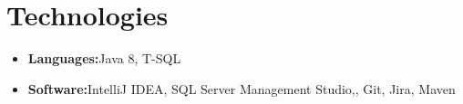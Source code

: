 \documentclass[letterpaper,11pt]{article}
\newcommand{\resumeSubHeadingListStart}{\begin{itemize}[leftmargin=*]}
\newcommand{\resumeSubHeadingListEnd}{\end{itemize}}
\begin{document}
	
	
	\section{Technologies}
	\resumeSubHeadingListStart
	\item{
		\textbf{Languages:}{\hfill Java 8, T-SQL}	
		\vspace{-5pt}	
	}
	\item{
		\textbf{Software:}{\hfill IntelliJ IDEA, SQL Server Management Studio,, Git, Jira, Maven}
		\vspace{-5pt}		
	}
	
%
	
	\resumeSubHeadingListEnd
	
	
\end{document}
